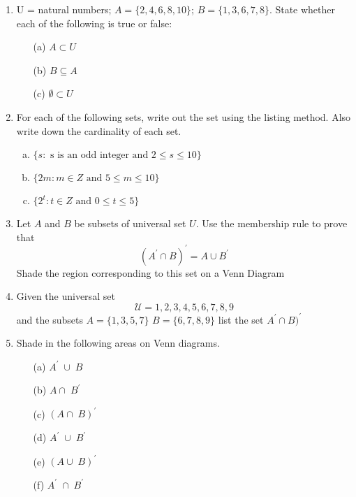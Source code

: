 \documentclass[a4paper,12pt]{article}
\begin{document}
\begin{enumerate}
\item 
U = {natural numbers}; $A = \{2, 4, 6, 8, 10\}$; $B = \{1, 3, 6, 7, 8\}$. State whether each of the following is true or false:
\begin{itemize}
\item[(a)] $A \subset U$
\item[(b)] $B \subseteq A$
\item[(c)] $\emptyset \subset U$
\end{itemize}

\item 
For each of the following sets, write out the set using the listing method.
Also write down the cardinality of each set.
\begin{enumerate}[(a)]
	\item $\{ s :  \mbox{ s is an odd integer and } 2 \leq s \leq 10 \}$
	\item $\{ 2m :  m \in Z \mbox{ and }5 \leq m \leq 10 \}$
	\item $\{ 2^t :  t \in Z \mbox{ and } 0 \leq t \leq 5 \}$
\end{enumerate}



\item Let $A$ and $B$ be subsets of universal set $U$. Use the membership rule to prove that
\[(A^\prime  \cap B)^\prime = A \cup B^\prime\]
Shade the region corresponding to this set on a Venn Diagram

\item Given the universal set $$\mathcal{U} = {1,2,3,4,5,6,7,8,9}$$ and the subsets $A=\{1,3,5,7\}$
$B = \{6,7,8,9\}$ list the set $A^\prime \cap B)^\prime$
\item Shade in the following areas on Venn diagrams.
\begin{multicols}{3}
\begin{itemize}
\item[(a)] $A^\prime\; \cup\; B$

\item[(b)] $A \cap\; B^\prime\;$

\item[(c)] $(A \cap\; B)^\prime\;$

\item[(d)] $A^\prime\; \cup\; B^\prime\;$

\item[(e)] $(A \cup\; B)^\prime\;$

\item[(f)] $A^\prime\; \cap\; B^\prime\;$


\end{itemize}
\end{multicols}
\end{enumerate}
\end{document}
